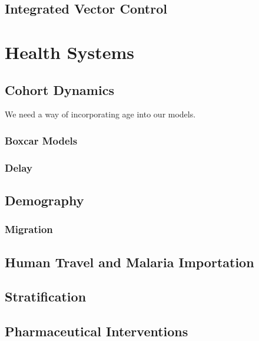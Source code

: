 \documentclass[
]{book}
\begin{document}
\chapter{Integrated Vector Control}\label{integrated-vector-control-1}

\part{Health Systems}\label{part-health-systems}

\chapter{Cohort Dynamics}\label{cohort-dynamics-1}

We need a way of incorporating age into our models.

\section{Boxcar Models}\label{boxcar-models}

\section{Delay}\label{delay}

\chapter{Demography}\label{demography}

\section{Migration}\label{migration-1}

\chapter{Human Travel and Malaria Importation}\label{human-travel-and-malaria-importation}

\chapter{Stratification}\label{stratification}

\chapter{Pharmaceutical Interventions}\label{pharmaceutical-interventions}
\end{document}
